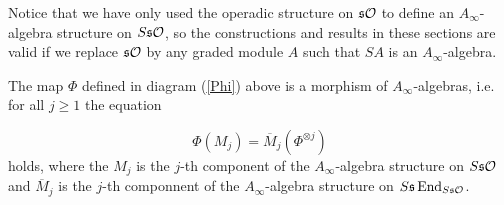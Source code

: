 \documentclass[Thesis.tex]{subfiles}
\begin{document}
\begin{remark}
Notice that we have only used the operadic structure on $\mathfrak{s}{\mathcal O}$ to define an $A_\infty$-algebra structure on $S\mathfrak{s}{\mathcal O}$, so the constructions and results in these sections are valid if we replace $\mathfrak{s}{\mathcal O}$ by any graded module $A$ such that $SA$ is an $A_\infty$-algebra. 
\end{remark}
\begin{thm}\label{theorem}
The map $\Phi$ defined in diagram (\ref{Phi}) above is a morphism of $A_\infty$-algebras, i.e. for all $j\geq 1$ the equation

\begin{equation}\label{theoremequation}
\Phi(M_j)=\overline{M}_j(\Phi^{\otimes j})
\end{equation}
holds, where the $M_j$ is the $j$-th component of the $A_\infty$-algebra structure on $S\mathfrak{s}{\mathcal O}$ and $\overline{M}_j$ is the $j$-th componnent of the $A_\infty$-algebra structure on $S\mathfrak{s}\operatorname{End}_{S\mathfrak{s}{\mathcal O}}$. 
\end{thm}
\end{document}
